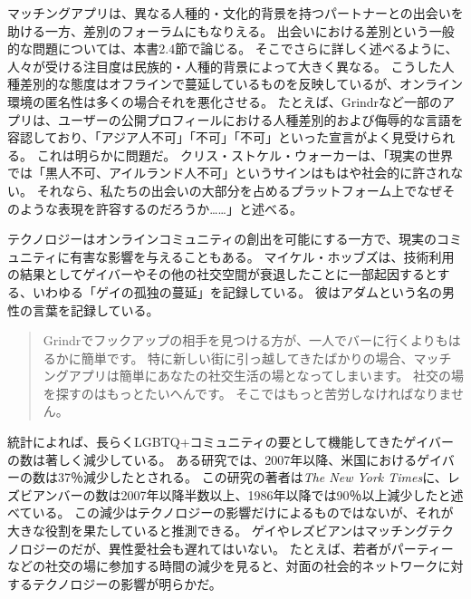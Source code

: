 \documentclass[paper=a4,book,openany]{jlreq}
\begin{document}
マッチングアプリは、異なる人種的・文化的背景を持つパートナーとの出会いを助ける一方、差別のフォーラムにもなりえる。
出会いにおける差別という一般的な問題については、本書2.4節で論じる。
そこでさらに詳しく述べるように、人々が受ける注目度は民族的・人種的背景によって大きく異なる。
こうした人種差別的な態度はオフラインで蔓延しているものを反映しているが、オンライン環境の匿名性は多くの場合それを悪化させる。
たとえば、Grindrなど一部のアプリは、ユーザーの公開プロフィールにおける人種差別的および侮辱的な言語を容認しており、「アジア人不可」「不可」「不可」といった宣言がよく見受けられる。
これは明らかに問題だ。
クリス・ストケル・ウォーカーは、「現実の世界では「黒人不可、アイルランド人不可」というサインはもはや社会的に許されない。
それなら、私たちの出会いの大部分を占めるプラットフォーム上でなぜそのような表現を許容するのだろうか……」と述べる\citep{stokel-walker18:_why_is_it_ok_onlin}。

テクノロジーはオンラインコミュニティの創出を可能にする一方で、現実のコミュニティに有害な影響を与えることもある。
マイケル・ホッブズは、技術利用の結果としてゲイバーやその他の社交空間が衰退したことに一部起因するとする、いわゆる「ゲイの孤独の蔓延」を記録している。
彼はアダムという名の男性の言葉を記録している。
\begin{quote}
  Grindrでフックアップの相手を見つける方が、一人でバーに行くよりもはるかに簡単です。
特に新しい街に引っ越してきたばかりの場合、マッチングアプリは簡単にあなたの社交生活の場となってしまいます。
社交の場を探すのはもっとたいへんです。
そこではもっと苦労しなければなりません。
\citep{hobbes17:_toget_alone}
\end{quote}

統計によれば、長らくLGBTQ+コミュニティの要として機能してきたゲイバーの数は著しく減少している。
ある研究では、2007年以降、米国におけるゲイバーの数は37％減少したとされる\citep{mattson19:_are_gay_bars_closin}。
この研究の著者は\emph{The New York Times}に、レズビアンバーの数は2007年以降半数以上、1986年以降では90％以上減少したと述べている\citep{wilson20:_where_did_all_lesbian_bars_go}。
この減少はテクノロジーの影響だけによるものではないが、それが大きな役割を果たしていると推測できる。
ゲイやレズビアンはマッチングテクノロジーのだが、異性愛社会も遅れてはいない。
たとえば、若者がパーティーなどの社交の場に参加する時間の減少を見ると、対面の社会的ネットワークに対するテクノロジーの影響が明らかだ\citep{wayne15:_death_party}。
\end{document}
